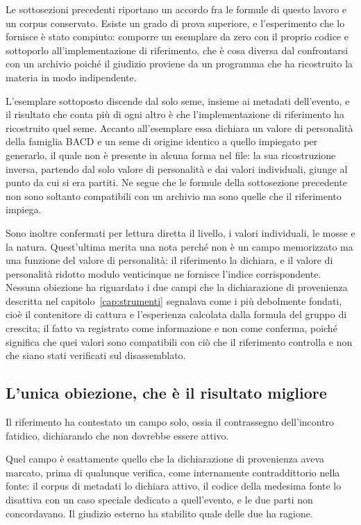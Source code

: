 Le sottosezioni precedenti riportano un accordo fra le formule di questo lavoro e un corpus conservato. Esiste un grado di prova superiore, e l'esperimento che lo fornisce è stato compiuto: comporre un esemplare da zero con il proprio codice e sottoporlo all'implementazione di riferimento, che è cosa diversa dal confrontarsi con un archivio poiché il giudizio proviene da un programma che ha ricostruito la materia in modo indipendente.

L'esemplare sottoposto discende dal solo seme, insieme ai metadati dell'evento, e il risultato che conta più di ogni altro è che l'implementazione di riferimento ha ricostruito quel seme. Accanto all'esemplare essa dichiara un valore di personalità della famiglia BACD e un seme di origine identico a quello impiegato per generarlo, il quale non è presente in alcuna forma nel file: la sua ricostruzione inversa, partendo dal solo valore di personalità e dai valori individuali, giunge al punto da cui si era partiti. Ne segue che le formule della sottosezione precedente non sono soltanto compatibili con un archivio ma sono quelle che il riferimento impiega.

Sono inoltre confermati per lettura diretta il livello, i valori individuali, le mosse e la natura. Quest'ultima merita una nota perché non è un campo memorizzato ma una funzione del valore di personalità: il riferimento la dichiara, e il valore di personalità ridotto modulo venticinque ne fornisce l'indice corrispondente. Nessuna obiezione ha riguardato i due campi che la dichiarazione di provenienza descritta nel capitolo~\ref{cap:strumenti} segnalava come i più debolmente fondati, cioè il contenitore di cattura e l'esperienza calcolata dalla formula del gruppo di crescita; il fatto va registrato come informazione e non come conferma, poiché significa che quei valori sono compatibili con ciò che il riferimento controlla e non che siano stati verificati sul disassemblato.

\subsection*{L'unica obiezione, che è il risultato migliore}

Il riferimento ha contestato un campo solo, ossia il contrassegno dell'incontro fatidico, dichiarando che non dovrebbe essere attivo.

Quel campo è esattamente quello che la dichiarazione di provenienza aveva marcato, prima di qualunque verifica, come internamente contraddittorio nella fonte: il corpus di metadati lo dichiara attivo, il codice della medesima fonte lo disattiva con un caso speciale dedicato a quell'evento, e le due parti non concordavano. Il giudizio esterno ha stabilito quale delle due ha ragione.

